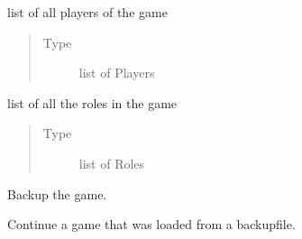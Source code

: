 \documentclass[letterpaper,10pt,english]{sphinxmanual}
\begin{document}
\begin{fulllineitems}

\begin{fulllineitems}
\label{\detokenize{chatwolf:chatwolf.game.Game.players}}
list of all players of the game
\begin{quote}\begin{description}
\item[{Type}] \leavevmode
list of Players

\end{description}\end{quote}

\end{fulllineitems}


\begin{fulllineitems}
\label{\detokenize{chatwolf:chatwolf.game.Game.roles}}
list of all the roles in the game
\begin{quote}\begin{description}
\item[{Type}] \leavevmode
list of Roles

\end{description}\end{quote}

\end{fulllineitems}


\begin{fulllineitems}
\label{\detokenize{chatwolf:chatwolf.game.Game.bkp}}
Backup the game.

\end{fulllineitems}


\begin{fulllineitems}
\label{\detokenize{chatwolf:chatwolf.game.Game.continue_bkp}}
Continue a game that was loaded from a backup\sphinxhyphen{}file.


\end{fulllineitems}
\end{fulllineitems}
\end{document}
